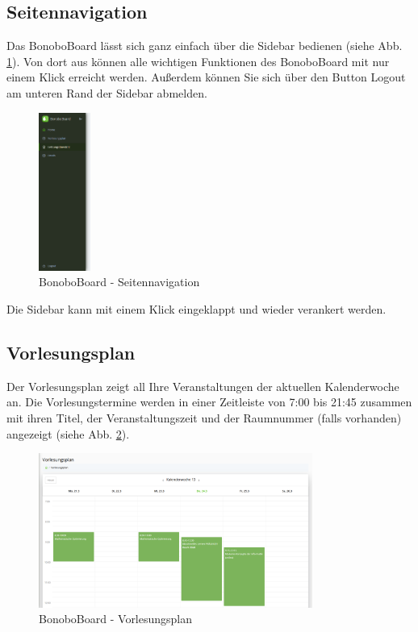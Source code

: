 \documentclass[a4paper,11pt]{scrartcl}
\begin{document}
\subsection{Seitennavigation}
Das BonoboBoard lässt sich ganz einfach über die Sidebar bedienen (siehe Abb. \ref{img:sidebar}). Von dort aus können alle wichtigen Funktionen des BonoboBoard mit nur einem Klick erreicht werden. Außerdem können Sie sich über den Button \frqq{}Logout\flqq{} am unteren Rand der Sidebar abmelden.

\begin{figure}[H]
	\begin{center}
		\includegraphics[width=0.15\textwidth]{sidebar}
		\caption{BonoboBoard - Seitennavigation}
		\label{img:sidebar}
	\end{center}
\end{figure}
\noindent

Die Sidebar kann mit einem Klick eingeklappt und wieder verankert werden.

\subsection{Vorlesungsplan}
Der Vorlesungsplan zeigt all Ihre Veranstaltungen der aktuellen Kalenderwoche an. Die Vorlesungstermine werden in einer Zeitleiste von 7:00 bis 21:45 zusammen mit ihren Titel, der Veranstaltungszeit und der Raumnummer (falls vorhanden) angezeigt (siehe Abb. \ref{img:lecture}). 

\begin{figure}[H]
	\begin{center}
		\includegraphics[width=0.8\textwidth]{lecture_plan}
		\caption{BonoboBoard - Vorlesungsplan}
		\label{img:lecture}
	\end{center}
\end{figure}
\noindent
\end{document}
